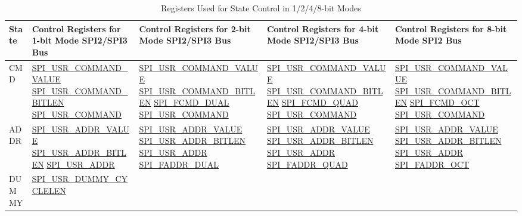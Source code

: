 \documentclass[main\_\_EN.tex]{subfiles}
\begin{document}
\begin{landscape}
\begin{longtable}[c]{ |L{1.3cm}|L{5.2cm}|L{5.2cm}|L{5.2cm}|L{5.2cm}| }
\caption{Registers Used for State Control in 1/2/4/8-bit Modes}
\\\hline
{}
\textbf{State} & \textbf{ Control Registers for 1-bit Mode SPI2/SPI3 Bus} & \textbf{ Control Registers for 2-bit Mode SPI2/SPI3 Bus} & \textbf{ Control Registers for 4-bit Mode SPI2/SPI3 Bus} & \textbf{ Control Registers for 8-bit Mode SPI2 Bus}\\
     \hline
\endhead
\label{tab:spi-usr1}
CMD  &\hyperref[fielddesc:SPIUSRCOMMANDVALUE]{SPI\_USR\_COMMAND\_VALUE}
     \hyperref[fielddesc:SPIUSRCOMMANDBITLEN]{SPI\_USR\_COMMAND\_BITLEN} \hyperref[fielddesc:SPIUSRCOMMAND]{SPI\_USR\_COMMAND}
     &\hyperref[fielddesc:SPIUSRCOMMANDVALUE]{SPI\_USR\_COMMAND\_VALUE} \hyperref[fielddesc:SPIUSRCOMMANDBITLEN]{SPI\_USR\_COMMAND\_BITLEN} \hyperref[fielddesc:SPIFCMDDUAL]{SPI\_FCMD\_DUAL}    \hyperref[fielddesc:SPIUSRCOMMAND]{SPI\_USR\_COMMAND} & \hyperref[fielddesc:SPIUSRCOMMANDVALUE]{SPI\_USR\_COMMAND\_VALUE} \hyperref[fielddesc:SPIUSRCOMMANDBITLEN]{SPI\_USR\_COMMAND\_BITLEN}  \hyperref[fielddesc:SPIFCMDQUAD]{SPI\_FCMD\_QUAD}   \hyperref[fielddesc:SPIUSRCOMMAND]{SPI\_USR\_COMMAND} & \hyperref[fielddesc:SPIUSRCOMMANDVALUE]{SPI\_USR\_COMMAND\_VALUE}
       \hyperref[fielddesc:SPIUSRCOMMANDBITLEN]{SPI\_USR\_COMMAND\_BITLEN} \hyperref[fielddesc:SPIFCMDOCT]{SPI\_FCMD\_OCT}    \hyperref[fielddesc:SPIUSRCOMMAND]{SPI\_USR\_COMMAND}\\
     \hline
ADDR &\hyperref[fielddesc:SPIUSRADDRVALUE]{SPI\_USR\_ADDR\_VALUE}
     \hyperref[fielddesc:SPIUSRADDRBITLEN]{SPI\_USR\_ADDR\_BITLEN}   \hyperref[fielddesc:SPIUSRADDR]{SPI\_USR\_ADDR}
     &\hyperref[fielddesc:SPIUSRADDRVALUE]{SPI\_USR\_ADDR\_VALUE}  \hyperref[fielddesc:SPIUSRADDRBITLEN]{SPI\_USR\_ADDR\_BITLEN}   \hyperref[fielddesc:SPIUSRADDR]{SPI\_USR\_ADDR}     \hyperref[fielddesc:SPIFADDRDUAL]{SPI\_FADDR\_DUAL} &
    \hyperref[fielddesc:SPIUSRADDRVALUE]{SPI\_USR\_ADDR\_VALUE}  \hyperref[fielddesc:SPIUSRADDRBITLEN]{SPI\_USR\_ADDR\_BITLEN}   \hyperref[fielddesc:SPIUSRADDR]{SPI\_USR\_ADDR}               \hyperref[fielddesc:SPIFADDRQUAD]{SPI\_FADDR\_QUAD} & \hyperref[fielddesc:SPIUSRADDRVALUE]{SPI\_USR\_ADDR\_VALUE}
       \hyperref[fielddesc:SPIUSRADDRBITLEN]{SPI\_USR\_ADDR\_BITLEN}   \hyperref[fielddesc:SPIUSRADDR]{SPI\_USR\_ADDR}     \hyperref[fielddesc:SPIFADDROCT]{SPI\_FADDR\_OCT} \\
     \hline
DUMMY&\hyperref[fielddesc:SPIUSRDUMMYCYCLELEN]{SPI\_USR\_DUMMY\_CYCLELEN}

\end{longtable}
\end{landscape}
\end{document}
